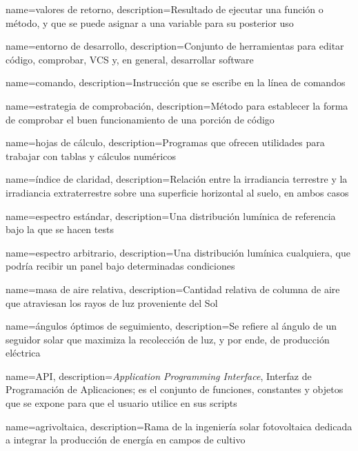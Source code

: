 {
    name={valores de retorno},
    description={Resultado de ejecutar una función o método, y que se puede asignar a una variable para su posterior uso}
}

{
    name={entorno de desarrollo},
    description={Conjunto de herramientas para editar código, comprobar, \gls{VCS} y, en general, desarrollar \gls{software}}
}

{
    name={comando},
    description={Instrucción que se escribe en la \gls{línea de comandos}}
}

{
    name={estrategia de comprobación},
    description={Método para establecer la forma de comprobar el buen funcionamiento de una porción de código}
}

{
    name={hojas de cálculo},
    description={Programas que ofrecen utilidades para trabajar con tablas y cálculos numéricos}
}

{
    name={índice de claridad},
    description={Relación entre la irradiancia terrestre y la irradiancia extraterrestre sobre una superficie horizontal al suelo, en ambos casos}
}

{
    name={espectro estándar},
    description={Una distribución lumínica de referencia bajo la que se hacen tests}
}

{
    name={espectro arbitrario},
    description={Una distribución lumínica cualquiera, que podría recibir un panel bajo determinadas condiciones}
}

{
    name={masa de aire relativa},
    description={Cantidad relativa de columna de aire que atraviesan los rayos de luz proveniente del Sol}
}

{
    name={ángulos óptimos de seguimiento},
    description={Se refiere al ángulo de un seguidor solar que maximiza la recolección de luz, y por ende, de producción eléctrica}
}

{
    name={API},
    description={\textit{Application Programming Interface}, Interfaz de Programación de Aplicaciones; es el conjunto de funciones, constantes y objetos que se expone para que el usuario utilice en sus \glspl{script}}
}

{
    name={agrivoltaica},
    description={Rama de la ingeniería solar fotovoltaica dedicada a integrar la producción de energía en campos de cultivo}
}

